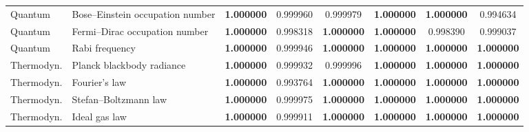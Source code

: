 \documentclass[twoside,11pt]{article}
\begin{document}
{\begin{longtable}{p{1.9cm}p{4.3cm}cccccc}
Quantum & Bose--Einstein occupation number & \textbf{1.000000} & 0.999960 & 0.999979 & \textbf{1.000000} & \textbf{1.000000} & 0.994634 \\
Quantum & Fermi--Dirac occupation number & \textbf{1.000000} & 0.998318 & \textbf{1.000000} & \textbf{1.000000} & 0.998390 & 0.999037 \\
Quantum & Rabi frequency & \textbf{1.000000} & 0.999946 & \textbf{1.000000} & \textbf{1.000000} & \textbf{1.000000} & \textbf{1.000000} \\
Thermodyn. & Planck blackbody radiance & \textbf{1.000000} & 0.999932 & 0.999996 & \textbf{1.000000} & \textbf{1.000000} & \textbf{1.000000} \\
Thermodyn. & Fourier's law & \textbf{1.000000} & 0.993764 & \textbf{1.000000} & \textbf{1.000000} & \textbf{1.000000} & \textbf{1.000000} \\
Thermodyn. & Stefan--Boltzmann law & \textbf{1.000000} & 0.999975 & \textbf{1.000000} & \textbf{1.000000} & \textbf{1.000000} & \textbf{1.000000} \\
Thermodyn. & Ideal gas law & \textbf{1.000000} & 0.999911 & \textbf{1.000000} & \textbf{1.000000} & \textbf{1.000000} & \textbf{1.000000} \\
\bottomrule
\end{longtable}}
\end{document}
